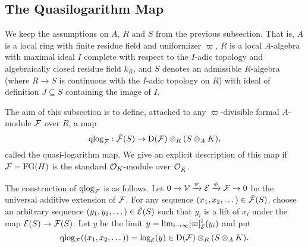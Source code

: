\documentclass[../main.tex]{subfiles}
\begin{document}



\subsection{The Quasilogarithm Map} %
\label{sub:The Quasilogarithm map}
We keep the assumptions on $A$, $R$ and $S$ from the previous subsection. That is,
$A$ is a local ring with finite residue field and uniformizer $\varpi$, 
$R$ is a local $A$-algebra with maximal ideal $I$ complete with respect to
the $I$-adic topology and algebraically closed residue field $k_R$, and 
$S$ denotes an admissible $R$-algebra (where $R \to S$ is continuous with
the $I$-adic topology on $R$) with ideal of definition $J \subseteq S$ containing
the image of $I$. 

The aim of this subsection is to define, attached to any $\varpi$-divisible formal
$A$-module $\mathcal{F}$ over $R$, a map
\begin{equation*}
\mathrm{qlog}_{\mathcal{F}}: \tilde {\mathcal{F}}(S) \to \mathrm{D}(\mathcal{F}) \otimes_R (S \otimes_A K),
\end{equation*}
called the quasi-logarithm map.
We give an explicit description of this map if $\mathcal{F} = \textnormal{FG}(H)$ is the standard
$\mathcal{O}_K$-module over $\mathcal{O}_{\breve K}$. 

The construction of $\mathrm{qlog}_{\mathcal{F}}$ is as follows.  
Let $0 \to \mathcal{V} \xrightarrow{\psi} \mathcal{E} \xrightarrow{\phi} \mathcal{F} \to 0$ be the universal additive
extension of $\mathcal{F}$. For any sequence $(x_1, x_2, \dots) \in \tilde {\mathcal{F}}(S)$, choose an arbitrary sequence $(y_1, y_2, \dots) \in
\tilde {\mathcal{E}}(S)$ such that $y_i$ is a lift of $x_i$ under the map $\mathcal{E}(S) \to \mathcal{F}(S)$. 
Let $y$ be the limit $y = \lim_{i \to \infty} [\varpi]_{\mathcal{E}}^i(y_i)$ and put 
$$\mathrm{qlog}_{\mathcal{F}}((x_1, x_2, \dots)) = \log_{\mathcal{E}}(y) \in \mathrm{D}(\mathcal{F}) \otimes_R(S \otimes_A K).$$ 
\end{document}
